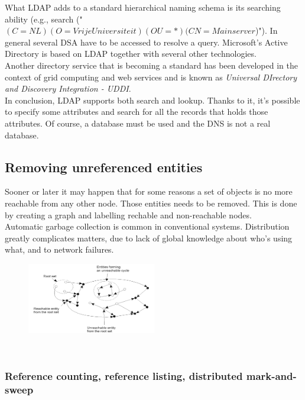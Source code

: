 \documentclass[10pt,a4paper]{article}
\begin{document}
What LDAP adds to a standard hierarchical naming schema is its searching ability (e.g., search ("$(C=NL)(O=Vrije Universiteit)(OU=*)(CN=Main server$)"). In general several DSA have to be accessed to resolve a query. Microsoft's Active Directory is based on LDAP together with several other technologies. \\
Another directory service that is becoming a standard has been developed in the context of grid computing and web services and is known as \textit{Universal DIrectory and Discovery Integration - UDDI}. \\ 
In conclusion, LDAP supports both search and lookup. Thanks to it, it's possible to specify some attributes and search for all the records that holds those attributes. Of course, a database must be used and the DNS is not a real database.
\subsection{Removing unreferenced entities}
Sooner or later it may happen that for some reasons a set of objects is no more reachable from any other node. Those entities needs to be removed. This is done by creating a graph and labelling rechable and non-reachable nodes. \\ Automatic garbage collection is common in conventional systems. Distribution greatly complicates matters, due to lack of global knowledge about who's using what, and to network failures.
\begin{figure}[h!]
 \hfill \includegraphics[width=160pt]{images/removing-ref.png}\hspace*{\fill}
  \label{fig:removing-ref}
\end{figure} \\
\subsubsection{Reference counting, reference listing, distributed mark-and-sweep}
\end{document}
